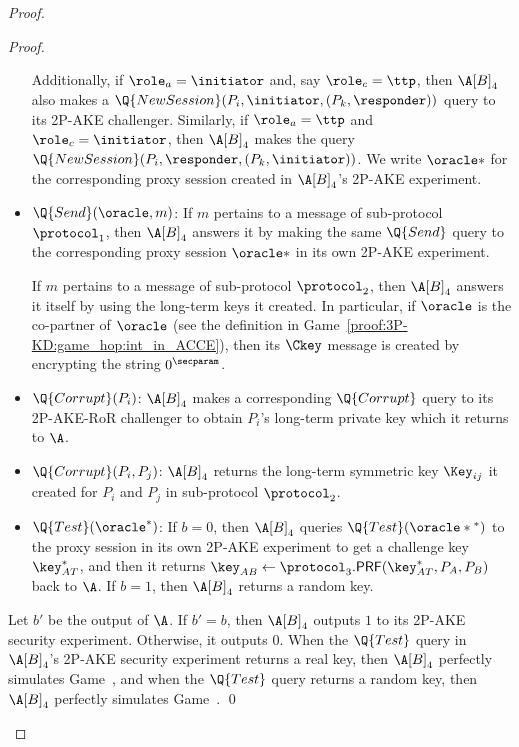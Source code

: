 \begin{proof}
\begin{proof}
\begin{itemize}
	Additionally, 
	if $\role_a = \initiator$ and,
	say $\role_c = \ttp$,
	then $\A[B]_4$ also makes a $\Q{NewSession}(P_i,\initiator, (P_k, \responder))$ query to its 2P-AKE challenger.
	Similarly,
	if $\role_a = \ttp$ and $\role_c = \initiator$,
	then $\A[B]_4$ makes the query $\Q{NewSession}(P_i,\responder, (P_k, \initiator))$.
	We write $\oracle*$ for the corresponding proxy session created in $\A[B]_4$'s 2P-AKE experiment.
	
	\item $\Q{Send}(\oracle, m)$: 
	If $m$ pertains to a message of sub-protocol  $\protocol_1$,
	then $\A[B]_4$ answers it by making the same $\Q{Send}$ query to the corresponding proxy  session $\oracle*$ in its own 2P-AKE experiment.

	If $m$ pertains to a message of sub-protocol $\protocol_2$,
	then $\A[B]_4$ answers it itself by using the long-term keys it created. 
	In particular,
	if $\oracle$ is the co-partner of $\oracle$ (see the definition in Game~\ref{proof:3P-KD:game_hop:int_in_ACCE}),
	then its $\Ckey$ message is created by encrypting the string $0^\secparam$.

	
	\item $\Q{Corrupt}(P_i)$: 
	$\A[B]_4$ makes a corresponding $\Q{Corrupt}$ query to its 2P-AKE-RoR challenger to obtain $P_i$'s long-term private key which it returns to $\A$.
	
	\item $\Q{Corrupt}(P_i, P_j)$: 
	$\A[B]_4$ returns the long-term symmetric key $\Key_{ij}$ it created for $P_i$ and $P_j$ in sub-protocol $\protocol_2$.
		 
	\item $\Q{Test}(\oracle^*)$:
	If $b = 0$,
	then $\A[B]_4$ queries $\Q{Test}(\oracle*{}^*)$ to the proxy session in its own 2P-AKE experiment to get a challenge key $\key_{AT}^*$,
	and then it returns $\key_{AB} \gets \protocol_3.\mathsf{PRF}(\key_{AT}^*, P_A, P_B)$ back to $\A$.
	If $b = 1$,
	then $\A[B]_4$ returns a random key. 
	
	
\end{itemize}
Let $b'$ be the output of $\A$.
If $b' = b$,
then $\A[B]_4$ outputs $1$ to its 2P-AKE security experiment.
Otherwise,
it outputs $0$.
When the $\Q{Test}$ query in $\A[B]_4$'s 2P-AKE security experiment returns a real key,
then $\A[B]_4$ perfectly simulates Game~\prevgame{},
and when the $\Q{Test}$ query returns a random key,
then $\A[B]_4$ perfectly simulates Game~\game{}.
\qed
\end{proof}
\fi


\end{proof}
